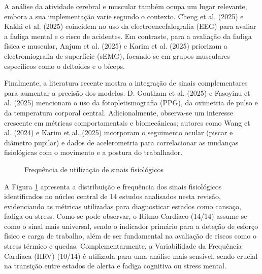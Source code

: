 A análise da atividade cerebral e muscular também ocupa um lugar relevante, embora a sua implementação varie segundo o contexto. Cheng et al. (2025) e Kakhi et al. (2025) \cite{cheng2025,kakhi2025} coincidem no uso da electroencefalografia (EEG) para avaliar a fadiga mental e o risco de acidentes. Em contraste, para a avaliação da fadiga física e muscular, Anjum et al. (2025) e Karim et al. (2025) \cite{anjum2025,karim2025} priorizam a electromiografia de superfície (sEMG), focando-se em grupos musculares específicos como o deltoides e o bíceps.

Finalmente, a literatura recente mostra a integração de sinais complementares para aumentar a precisão dos modelos. D. Goutham et al. (2025) e Fasoyinu et al. (2025) \cite{goutham2025,fasoyinu2025} mencionam o uso da fotopletismografia (PPG), da oximetria de pulso e da temperatura corporal central. Adicionalmente, observa-se um interesse crescente em métricas comportamentais e biomecânicas; autores como Wang et al. (2024) e Karim et al. (2025) \cite{wang2024,karim2025} incorporam o seguimento ocular (piscar e diâmetro pupilar) e dados de acelerometria para correlacionar as mudanças fisiológicas com o movimento e a postura do trabalhador.

\begin{figure}[H]
\centering
{}
\caption{Frequência de utilização de sinais fisiológicos}
\label{fig:sinais}
\end{figure}

A Figura \ref{fig:sinais} apresenta a distribuição e frequência dos sinais fisiológicos identificados no núcleo central de 14 estudos analisados nesta revisão, evidenciando as métricas utilizadas para diagnosticar estados como cansaço, fadiga ou stress. Como se pode observar, o Ritmo Cardíaco (14/14) assume-se como o sinal mais universal, sendo o indicador primário para a deteção de esforço físico e carga de trabalho, além de ser fundamental na avaliação de riscos como o stress térmico e quedas. Complementarmente, a Variabilidade da Frequência Cardíaca (HRV) (10/14) é utilizada para uma análise mais sensível, sendo crucial na transição entre estados de alerta e fadiga cognitiva ou stress mental.


